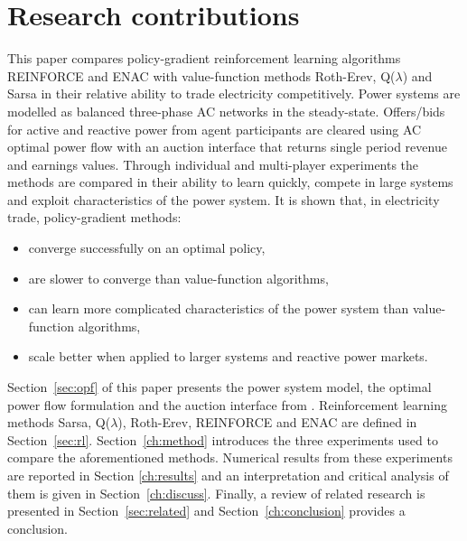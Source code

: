 \section{Research contributions}
%
This paper compares policy-gradient reinforcement learning algorithms
REINFORCE and ENAC with value-function methods Roth-Erev, Q($\lambda$) and
Sarsa in their relative ability to trade electricity competitively.  Power
systems are modelled as balanced three-phase AC networks in the steady-state.
Offers/bids for active and reactive power from agent participants are cleared
using AC optimal power flow with an auction interface that returns single
period revenue and earnings values. Through individual and multi-player
experiments the methods are compared in their ability to learn quickly, compete
in large systems and exploit characteristics of the power system. It is shown
that, in electricity trade, policy-gradient methods:
\begin{itemize}
  \item converge successfully on an optimal policy,
  \item are slower to converge than value-function algorithms,
  \item can learn more complicated characteristics of the power system than
  value-function algorithms,
  \item scale better when applied to larger systems and reactive power markets.
\end{itemize}
Section~\ref{sec:opf} of this paper presents the power system model, the
optimal power flow formulation and the auction interface from \matpower.
Reinforcement learning methods Sarsa, Q($\lambda$), Roth-Erev, REINFORCE and
ENAC are defined in Section~\ref{sec:rl}. Section~\ref{ch:method} introduces
the three experiments used to compare the aforementioned methods. Numerical
results from these experiments are reported in Section \ref{ch:results} and
an interpretation and critical analysis of them is given in
Section~\ref{ch:discuss}.  Finally, a review of related research is presented
in Section~\ref{sec:related} and Section~\ref{ch:conclusion} provides a
conclusion.

